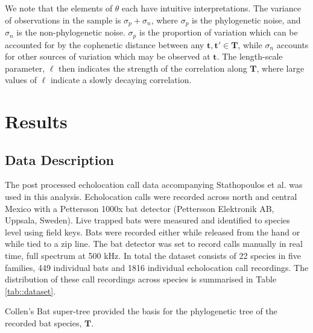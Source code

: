 \documentclass[wsdraft]{ws-rv9x6} %
\begin{document}
We note that the elements of \(\theta\) each have intuitive interpretations. The variance of observations in the sample is \(\sigma_p + \sigma_n\), where \(\sigma_p\) is the phylogenetic noise, and \(\sigma_n\) is the non-phylogenetic noise. \(\sigma_p\) is the proportion of variation which can be accounted for by the cophenetic distance between any \(\mathbf{t}, \mathbf{t}' \in \mathbf{T}\), while \(\sigma_n\) accounts for other sources of variation which may be observed at \(\mathbf{t}\). The length-scale parameter, \(\ell\) then indicates the strength of the correlation along \(\mathbf{T}\), where large values of \(\ell\) indicate a slowly decaying correlation. 

\section{Results}

\subsection{Data Description}

The post processed echolocation call data accompanying Stathopoulos et al. \cite{stathopoulos2017bat} was used in this analysis. Echolocation calls were recorded across north and central Mexico with a Pettersson 1000x bat detector (Pettersson Elektronik AB, Uppsala, Sweden). Live trapped bats were measured and identified to species level using field keys.\cite{ceballos2005mamiferos} \cite{medellin2sanchez} Bats were recorded either while released from the hand or while tied to a zip line. The bat detector was set to record calls manually in real time, full spectrum at 500 kHz. 
In total the dataset consists of 22 species in five families, 449 individual bats and 1816 individual echolocation call recordings. The distribution of these call recordings across species is summarised in Table \ref{tab::dataset}.

Collen's \cite{collen2012evolution} Bat super-tree provided the basis for the phylogenetic tree of the recorded bat species, \(\mathbf{T}\). 
\end{document}
